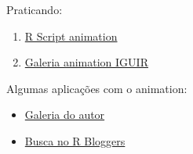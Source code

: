\begin{frame}

  Praticando:
  \begin{enumerate}
  \item \href{run:./R/animation/animation.R}{R Script animation}
  \item \href{run:./animation/animation.html}{Galeria animation IGUIR}
  \end{enumerate}
  
  \vspace{0.5cm}
  Algumas aplicações com o animation:
  \begin{itemize}
  \item \href{http://vis.supstat.com/categories.html\#animation-ref}{Galeria
      do autor}
  \item \href{http://www.r-bloggers.com/?s=animation}{Busca no R
      Bloggers}
  \end{itemize}

\end{frame}
